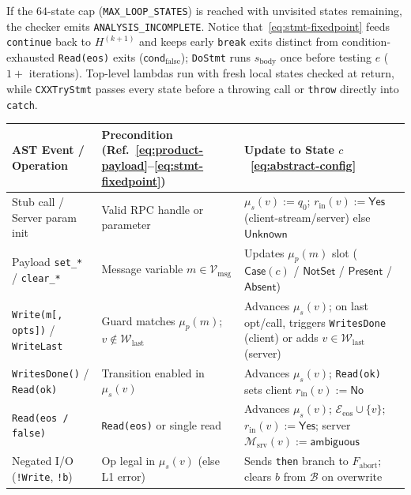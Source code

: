 If the $64$-state cap (\texttt{MAX\_LOOP\_STATES}) is reached with unvisited states remaining, the checker emits \texttt{ANALYSIS\_\allowbreak INCOMPLETE}. Notice that~\eqref{eq:stmt-fixedpoint} feeds \texttt{continue} back to $H^{(k+1)}$ and keeps early \texttt{break} exits distinct from condition-exhausted \texttt{Read(eos)} exits ($\mathsf{cond}_{\mathrm{false}}$); \texttt{DoStmt} runs $s_{\mathrm{body}}$ once before testing $e$ ($1+$ iterations). Top-level lambdas run with fresh local states checked at return, while \texttt{CXXTryStmt} passes every state before a throwing call or \texttt{throw} directly into \texttt{catch}.

\begin{table}[htbp]
\centering
\footnotesize
\setlength{\tabcolsep}{3pt}
\renewcommand{\arraystretch}{1.12}
\begin{tabular*}{\textwidth}{@{\extracolsep{\fill}}>{\raggedright\arraybackslash}p{}>{\raggedright\arraybackslash}p{}>{\raggedright\arraybackslash}p{}@{}}
\toprule
\textbf{AST Event / Operation} & \textbf{Precondition (Ref.~\eqref{eq:product-payload}--\eqref{eq:stmt-fixedpoint})} & \textbf{Update to State $c$~\eqref{eq:abstract-config}} \\
\midrule
Stub call / Server param init & Valid RPC handle or parameter & $\mu_s(v):=q_0$; $r_{\mathrm{in}}(v):=\mathsf{Yes}$ (client-stream/server) else $\mathsf{Unknown}$ \\
Payload \texttt{set\_*} / \texttt{clear\_*} & Message variable $m \in \mathcal{V}_{\mathrm{msg}}$ & Updates $\mu_p(m)$ slot ($\mathsf{Case}(c)$ / $\mathsf{NotSet}$ / $\mathsf{Present}$ / $\mathsf{Absent}$) \\
\texttt{Write(m[, opts])} / \texttt{WriteLast} & Guard matches $\mu_p(m)$; $v \notin \mathcal{W}_{\mathrm{last}}$ & Advances $\mu_s(v)$; on last opt/call, triggers \texttt{WritesDone} (client) or adds $v\in\mathcal{W}_{\mathrm{last}}$ (server) \\
\texttt{WritesDone()} / \texttt{Read(ok)} & Transition enabled in $\mu_s(v)$ & Advances $\mu_s(v)$; \texttt{Read(ok)} sets client $r_{\mathrm{in}}(v):=\mathsf{No}$ \\
\texttt{Read(eos / false)} & \texttt{Read(eos)} or single read & Advances $\mu_s(v)$; $\mathcal{E}_{\mathrm{eos}}\cup\{v\}$; $r_{\mathrm{in}}(v):=\mathsf{Yes}$; server $\mathcal{M}_{\mathrm{srv}}(v):=\mathsf{ambiguous}$ \\
Negated I/O (\texttt{!Write}, \texttt{!b}) & Op legal in $\mu_s(v)$ (else L1 error) & Sends \texttt{then} branch to $F_{\mathrm{abort}}$; clears $b$ from $\mathcal{B}$ on overwrite \\

\end{tabular*}
\end{table}
